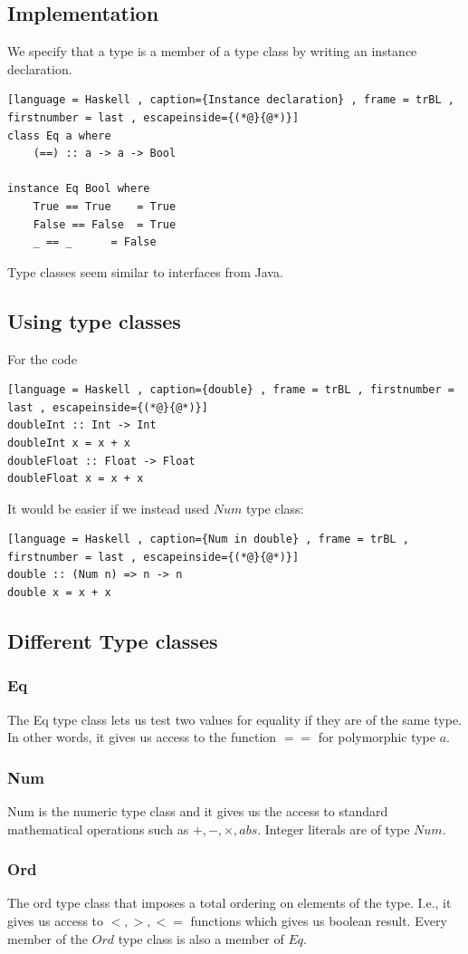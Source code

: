 \documentclass[a4paper]{article}
\theoremstyle{plain}
\theoremstyle{definition}
\theoremstyle{remark}
\begin{document}
\subsection{Implementation}
We specify that a type is a member of a type class by writing an instance declaration.
\begin{lstlisting}[language = Haskell , caption={Instance declaration} , frame = trBL , firstnumber = last , escapeinside={(*@}{@*)}]
class Eq a where
	(==) :: a -> a -> Bool

instance Eq Bool where
	True == True	= True
	False == False	= True
	_ == _		= False
\end{lstlisting}
Type classes seem similar to interfaces from Java. 
\subsection{Using type classes}
For the code
\begin{lstlisting}[language = Haskell , caption={double} , frame = trBL , firstnumber = last , escapeinside={(*@}{@*)}]
doubleInt :: Int -> Int
doubleInt x = x + x
doubleFloat :: Float -> Float
doubleFloat x = x + x
\end{lstlisting}
It would be easier if we instead used $Num$ type class:
\begin{lstlisting}[language = Haskell , caption={Num in double} , frame = trBL , firstnumber = last , escapeinside={(*@}{@*)}]
double :: (Num n) => n -> n
double x = x + x
\end{lstlisting}
\subsection{Different Type classes}
\subsubsection{Eq}
The Eq type class lets us test two values for equality if they are of the same type. In other words, it gives us access to the function $==$ for polymorphic type $a$.
\subsubsection{Num}
Num is the numeric type class and it gives us the access to standard mathematical operations such as $+,-,\times ,abs$. Integer literals are of type $Num$.
\subsubsection{Ord}
The ord type class that imposes a total ordering on elements of the type.
I.e., it gives us access to $<, >, <=$ functions which gives us boolean result. Every member of the $Ord$ type class is also a member of $Eq$. 
\end{document}
